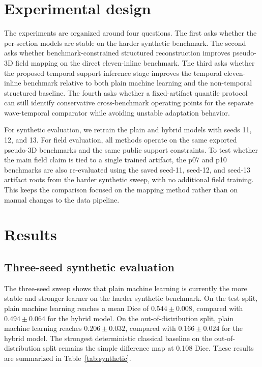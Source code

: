 \documentclass[preprint,12pt]{elsarticle}
\begin{document}
\section{Experimental design}

The experiments are organized around four questions. The first asks whether the per-section models are stable on the harder synthetic benchmark. The second asks whether benchmark-constrained structured reconstruction improves pseudo-3D field mapping on the direct eleven-inline benchmark. The third asks whether the proposed temporal support inference stage improves the temporal eleven-inline benchmark relative to both plain machine learning and the non-temporal structured baseline. The fourth asks whether a fixed-artifact quantile protocol can still identify conservative cross-benchmark operating points for the separate wave-temporal comparator while avoiding unstable adaptation behavior.

For synthetic evaluation, we retrain the plain and hybrid models with seeds 11, 12, and 13. For field evaluation, all methods operate on the same exported pseudo-3D benchmarks and the same public support constraints. To test whether the main field claim is tied to a single trained artifact, the p07 and p10 benchmarks are also re-evaluated using the saved seed-11, seed-12, and seed-13 artifact roots from the harder synthetic sweep, with no additional field training. This keeps the comparison focused on the mapping method rather than on manual changes to the data pipeline.

\section{Results}

\subsection{Three-seed synthetic evaluation}

The three-seed sweep shows that plain machine learning is currently the more stable and stronger learner on the harder synthetic benchmark. On the test split, plain machine learning reaches a mean Dice of $0.544 \pm 0.008$, compared with $0.494 \pm 0.064$ for the hybrid model. On the out-of-distribution split, plain machine learning reaches $0.206 \pm 0.032$, compared with $0.166 \pm 0.024$ for the hybrid model. The strongest deterministic classical baseline on the out-of-distribution split remains the simple difference map at 0.108 Dice. These results are summarized in Table~\ref{tab:synthetic}.
\end{document}
